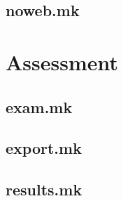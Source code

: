 \documentclass{report}
\begin{document}
\chapter{noweb.mk}


\part{Assessment}

\chapter{exam.mk}


\chapter{export.mk}


\chapter{results.mk}



\printbibliography{}
\end{document}
